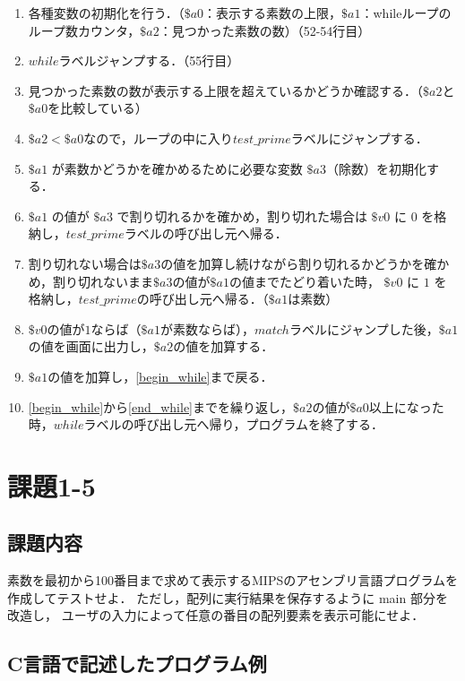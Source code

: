 \documentclass[a4j,11pt]{jarticle}
\begin{document}
\begin{enumerate}
      \item 各種変数の初期化を行う．（$\$a0$：表示する素数の上限，$\$a1$：whileループのループ数カウンタ，$\$a2$：見つかった素数の数）（52-54行目）
      \item $while$ラベルジャンプする．（55行目）
      \item \label{begin_while}見つかった素数の数が表示する上限を超えているかどうか確認する．（$\$a2$と$\$a0$を比較している）
      \item $\$a2 < \$a0$なので，ループの中に入り$test\_prime$ラベルにジャンプする．
      \item $\$a1$ が素数かどうかを確かめるために必要な変数 $\$a3$（除数）を初期化する．
      \item $\$a1$ の値が $\$a3$ で割り切れるかを確かめ，割り切れた場合は $\$v0$ に $0$ を格納し，$test\_prime$ラベルの呼び出し元へ帰る．
      \item 割り切れない場合は$\$a3$の値を加算し続けながら割り切れるかどうかを確かめ，割り切れないまま$\$a3$の値が$\$a1$の値までたどり着いた時，
      $\$v0$ に $1$ を格納し，$test\_prime$の呼び出し元へ帰る．（$\$a1$は素数）
      \item $\$v0$の値が$1$ならば（$\$a1$が素数ならば），$match$ラベルにジャンプした後，$\$a1$の値を画面に出力し，$\$a2$の値を加算する．
      \item \label{end_while}$\$a1$の値を加算し，\ref{begin_while}まで戻る．
      \item \ref{begin_while}から\ref{end_while}までを繰り返し，$\$a2$の値が$\$a0$以上になった時，$while$ラベルの呼び出し元へ帰り，プログラムを終了する．
\end{enumerate}
\section{課題1-5}

\subsection{課題内容}

素数を最初から100番目まで求めて表示するMIPSのアセンブリ言語プログラムを作成してテストせよ． 
ただし，配列に実行結果を保存するように main 部分を改造し， 
ユーザの入力によって任意の番目の配列要素を表示可能にせよ．

\subsection{C言語で記述したプログラム例}
\end{document}
